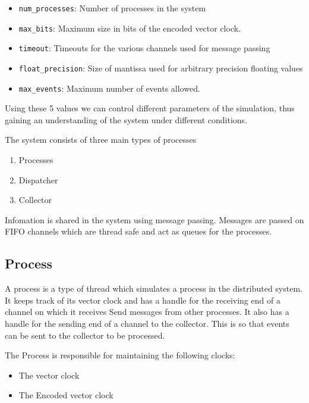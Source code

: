 \documentclass[]{article}
\providecommand{\tightlist}{%
  \setlength{\itemsep}{0pt}\setlength{\parskip}{0pt}}
\begin{document}
\begin{itemize}
\tightlist
\item
  \texttt{num\_processes}: Number of processes in the system
\item
  \texttt{max\_bits}: Maximum size in bits of the encoded vector clock.
\item
  \texttt{timeout}: Timeouts for the various channels used for message
  passing
\item
  \texttt{float\_precision}: Size of mantissa used for arbitrary
  precision floating values
\item
  \texttt{max\_events}: Maximum number of events allowed.
\end{itemize}

Using these 5 values we can control different parameters of the
simulation, thus gaining an understanding of the system under different
conditions.

The system consists of three main types of processes

\begin{enumerate}
\def\labelenumi{\arabic{enumi}.}
\tightlist
\item
  Processes
\item
  Dispatcher
\item
  Collector
\end{enumerate}

Infomation is shared in the system using message passing. Messages are
passed on FIFO channels which are thread safe and act as queues for the
processes.

\hypertarget{process}{%
\subsection{Process}\label{process}}

A process is a type of thread which simulates a process in the
distributed system. It keeps track of its vector clock and has a handle
for the receiving end of a channel on which it receives Send messages
from other processes. It also has a handle for the sending end of a
channel to the collector. This is so that events can be sent to the
collector to be processed.

The Process is responsible for maintaining the following clocks:

\begin{itemize}
\tightlist
\item
  The vector clock
\item
  The Encoded vector clock
\end{itemize}
\end{document}
